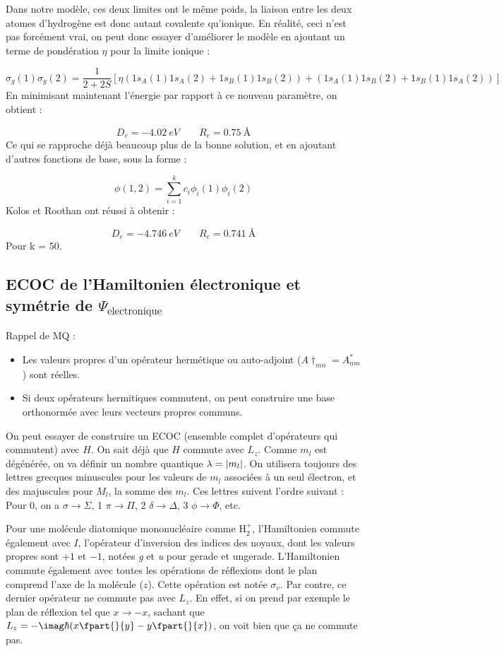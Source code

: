 Dans notre modèle, ces deux limites ont le même poids, la liaison entre les deux atomes d'hydrogène est donc autant covalente qu'ionique. En réalité, ceci n'est pas forcément vrai, on peut donc essayer d'améliorer le modèle en ajoutant un terme de pondération $\eta$ pour la limite ionique :

\[
    \sigma_g(1)\sigma_g(2) = \dfrac{1}{2+2S}[\eta(1s_A(1)1s_A(2)+1s_B(1)1s_B(2)) + (1s_A(1)1s_B(2)+1s_B(1)1s_A(2))]
\]
En minimisant maintenant l'énergie par rapport à ce nouveau paramètre, on obtient :

\[ D_e = \SI{-4.02}{eV} \quad \quad R_e = \SI{0.75}{\angstrom} \]
Ce qui se rapproche déjà beaucoup plus de la bonne solution, et en ajoutant d'autres fonctions de base, sous la forme :

\[ \phi(1,2) = \sum\limits_{i=1}^kc_i\phi_i(1)\phi_i(2) \]
Kolos et Roothan ont réussi à obtenir :

\[ D_e = \SI{-4.746}{eV} \quad \quad R_e = \SI{0.741}{\angstrom} \]
Pour k = 50.


\subsection{ECOC de l'Hamiltonien électronique et symétrie de $\Psi_\text{electronique}$}

Rappel de MQ :
\begin{itemize}
    \item Les valeurs propres d'un opérateur hermétique ou auto-adjoint ($A\dagger_{mn} = A^*_{nm}$) sont réelles.
    \item Si deux opérateurs hermitiques commutent, on peut construire une base orthonormée avec leurs vecteurs propres communs.
\end{itemize}
On peut essayer de construire un ECOC (ensemble complet d'opérateurs qui commutent) avec $H$.
On sait déjà que $H$ commute avec $L_z$. Comme $m_l$ est dégénérée, on va définir un nombre quantique $\lambda = \abs{m_l}$. On utilisera toujours des lettres grecques minuscules pour les valeurs de $m_l$ associées à un seul électron, et des majuscules pour $M_l$, la somme des $m_l$. Ces lettres suivent l'ordre suivant :
Pour 0, on a $\sigma \rightarrow\Sigma$, 1 $\pi\rightarrow\Pi$, 2 $\delta\rightarrow\Delta$, 3 $\phi\rightarrow\Phi$, etc.


Pour une molécule diatomique mononucléaire comme H$_2^+$, l'Hamiltonien commute également avec $I$, l'opérateur d'inversion des indices des noyaux, dont les valeurs propres sont $+1$ et $-1$, notées \textit{g} et \textit{u} pour gerade et ungerade.
L'Hamiltonien commute également avec toutes les opérations de réflexions dont le plan comprend l'axe de la molécule ($z$). Cette opération est notée $\sigma_v$. Par contre, ce dernier opérateur ne commute pas avec $L_z$. En effet, si on prend par exemple le plan de réflexion tel que $x\rightarrow-x$, sachant que $L_z = -\imag\hbar(x\fpart{}{y}-y\fpart{}{x})$, on voit bien que ça ne commute pas.


